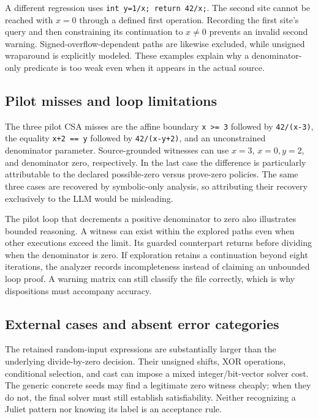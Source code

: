 \documentclass[sigconf]{acmart}
\begin{document}
A different regression uses \texttt{int y=1/x; return 42/x;}. The second site
cannot be reached with $x=0$ through a defined first operation. Recording the
first site's query and then constraining its continuation to $x\ne0$ prevents
an invalid second warning. Signed-overflow-dependent paths are likewise
excluded, while unsigned wraparound is explicitly modeled. These examples
explain why a denominator-only predicate is too weak even when it appears in
the actual source.

\subsection{Pilot misses and loop limitations}
The three pilot CSA misses are the affine boundary \texttt{x >= 3} followed by
\texttt{42/(x-3)}, the equality \texttt{x+2 == y} followed by
\texttt{42/(x-y+2)}, and an unconstrained denominator parameter. Source-grounded
witnesses can use $x=3$, $x=0,y=2$, and denominator zero, respectively. In the
last case the difference is particularly attributable to the declared
possible-zero versus prove-zero policies. The same three cases are recovered
by symbolic-only analysis, so attributing their recovery exclusively to the
LLM would be misleading.

The pilot loop that decrements a positive denominator to zero also illustrates
bounded reasoning. A witness can exist within the explored paths even when
other executions exceed the limit. Its guarded counterpart returns before
dividing when the denominator is zero. If exploration retains a continuation
beyond eight iterations, the analyzer records incompleteness instead of
claiming an unbounded loop proof. A warning matrix can still classify the file
correctly, which is why dispositions must accompany accuracy.

\subsection{External cases and absent error categories}
\ExternalCases{}
The retained random-input expressions are substantially larger than the
underlying divide-by-zero decision. Their unsigned shifts, XOR operations,
conditional selection, and cast can impose a mixed integer/bit-vector solver
cost. The generic concrete seeds may find a legitimate zero witness cheaply;
when they do not, the final solver must still establish satisfiability. Neither
recognizing a Juliet pattern nor knowing its label is an acceptance rule.
\end{document}
